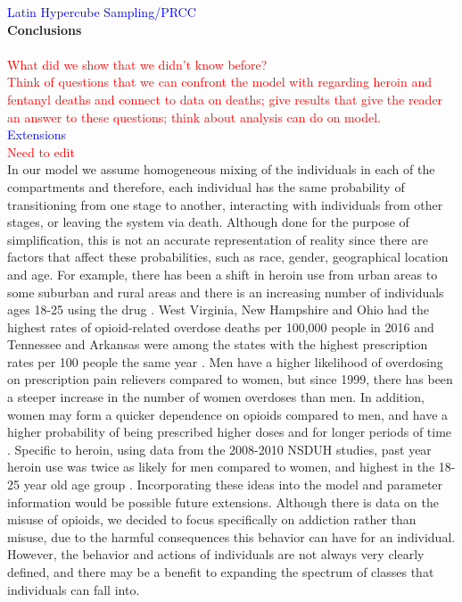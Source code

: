 \documentclass[12pt]{article}
\begin{document}


\textcolor{blue}{Latin Hypercube Sampling/PRCC} \\




 
\textbf{Conclusions} \\ \\
 \textcolor{red}{What did we show that we didn't know before?} \\
 \textcolor{red}{Think of questions that we can confront the model with regarding heroin and fentanyl deaths and connect to data on deaths; give results that give the reader an answer to these questions; think about analysis can do on model.} \\
 
 \textcolor{blue}{Extensions}\\
 \textcolor{red}{Need to edit} \\
In our model we assume homogeneous mixing of the individuals in each of the compartments and therefore, each individual has the same probability of transitioning from one stage to another, interacting with individuals from other stages, or leaving the system via death. Although done for the purpose of simplification, this is not an accurate representation of reality since there are factors that affect these probabilities, such as race, gender, geographical location and age. For example, there has been a shift in heroin use from urban areas to some suburban and rural areas and there is an increasing number of individuals ages 18-25 using the drug \cite{NIDA2}. West Virginia, New Hampshire and Ohio had the highest rates of opioid-related overdose deaths per 100,000 people in 2016 and Tennessee and Arkansas were among the states with the highest prescription rates per 100 people the same year \cite{NIH3}. Men have a higher likelihood of overdosing on prescription pain relievers compared to women, but since 1999, there has been a steeper increase in the number of women overdoses than men. In addition, women may form a quicker dependence on opioids compared to men, and have a higher probability of being prescribed higher doses and for longer periods of time \cite{CDC5}. Specific to heroin, using data from the 2008-2010 NSDUH studies, past year heroin use was twice as likely for men compared to women, and highest in the 18-25 year old age group \cite{Jones}. Incorporating these ideas into the model and parameter information would be possible future extensions. Although there is data on the misuse of opioids, we decided to focus specifically on addiction rather than misuse, due to the harmful consequences this behavior can have for an individual. However, the behavior and actions of individuals are not always very clearly defined, and there may be a benefit to expanding the spectrum of classes that individuals can fall into. 
\end{document}
